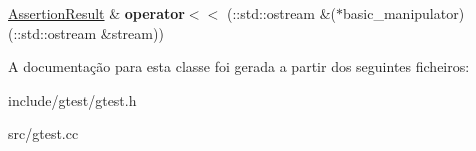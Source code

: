 \begin{DoxyCompactItemize}
\item 
\hypertarget{classtesting_1_1AssertionResult_a43ae8a260843ce2ff3dc9af262672b8b}{\hyperlink{classtesting_1_1AssertionResult}{Assertion\-Result} \& {\bfseries operator$<$$<$} (\-::std\-::ostream \&($\ast$basic\-\_\-manipulator)(\-::std\-::ostream \&stream))}\label{classtesting_1_1AssertionResult_a43ae8a260843ce2ff3dc9af262672b8b}

\end{DoxyCompactItemize}


A documentação para esta classe foi gerada a partir dos seguintes ficheiros\-:\begin{DoxyCompactItemize}
\item 
include/gtest/gtest.\-h\item 
src/gtest.\-cc\end{DoxyCompactItemize}
